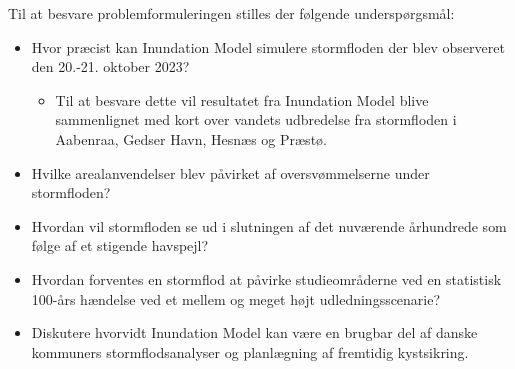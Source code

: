Til at besvare problemformuleringen stilles der følgende underspørgsmål:
\begin{itemize}
    \setlength{\itemsep}{0pt}
    \setlength{\parskip}{0pt}
    \setlength{\parsep}{0pt}
    \item Hvor præcist kan Inundation Model simulere stormfloden der blev observeret den 20.-21. oktober 2023?
    \begin{itemize}
        \item Til at besvare dette vil resultatet fra Inundation Model blive sammenlignet med kort over vandets udbredelse fra stormfloden i Aabenraa, Gedser Havn, Hesnæs og Præstø.
    \end{itemize}
    \item Hvilke arealanvendelser blev påvirket af oversvømmelserne under stormfloden?
    \item Hvordan vil stormfloden se ud i slutningen af det nuværende århundrede som følge af et stigende havspejl?
    \item Hvordan forventes en stormflod at påvirke studieområderne ved en statistisk 100-års hændelse ved et mellem og meget højt udledningsscenarie?
    \item Diskutere hvorvidt Inundation Model kan være en brugbar del af danske kommuners stormflodsanalyser og planlægning af fremtidig kystsikring.
\end{itemize}